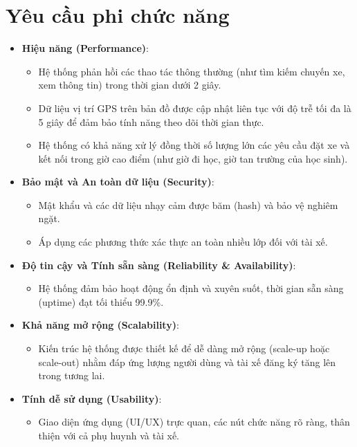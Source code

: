 \documentclass[../DoAn.tex]{subfiles}
\begin{document}
\section{Yêu cầu phi chức năng}
\label{section:2.4}
\begin{itemize}
    \item \textbf{Hiệu năng (Performance)}:
          \begin{itemize}
              \item Hệ thống phản hồi các thao tác thông thường (như tìm kiếm chuyến xe, xem thông tin) trong thời gian dưới 2 giây.
              \item Dữ liệu vị trí GPS trên bản đồ được cập nhật liên tục với độ trễ tối đa là 5 giây để đảm bảo tính năng theo dõi thời gian thực.
              \item Hệ thống có khả năng xử lý đồng thời số lượng lớn các yêu cầu đặt xe và kết nối trong giờ cao điểm (như giờ đi học, giờ tan trường của học sinh).
          \end{itemize}
    \item \textbf{Bảo mật và An toàn dữ liệu (Security)}:
          \begin{itemize}
              \item Mật khẩu và các dữ liệu nhạy cảm được băm (hash) và bảo vệ nghiêm ngặt.
              \item Áp dụng các phương thức xác thực an toàn nhiều lớp đối với tài xế.
          \end{itemize}
    \item \textbf{Độ tin cậy và Tính sẵn sàng (Reliability \& Availability)}:
          \begin{itemize}
              \item Hệ thống đảm bảo hoạt động ổn định và xuyên suốt, thời gian sẵn sàng (uptime) đạt tối thiểu 99.9\%.
          \end{itemize}
    \item \textbf{Khả năng mở rộng (Scalability)}:
          \begin{itemize}
              \item Kiến trúc hệ thống được thiết kế để dễ dàng mở rộng (scale-up hoặc scale-out) nhằm đáp ứng lượng người dùng và tài xế đăng ký tăng lên trong tương lai.
          \end{itemize}
    \item \textbf{Tính dễ sử dụng (Usability)}:
          \begin{itemize}
              \item Giao diện ứng dụng (UI/UX) trực quan, các nút chức năng rõ ràng, thân thiện với cả phụ huynh và tài xế.
          \end{itemize}
\end{itemize}


\end{document}
